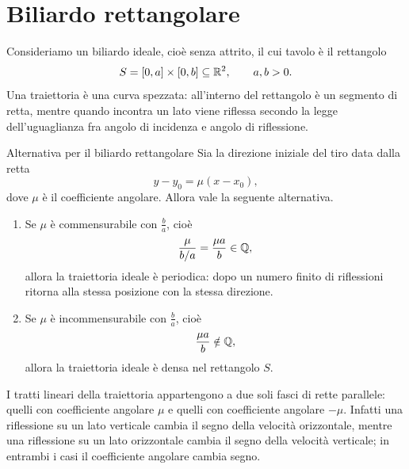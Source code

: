 \documentclass[a4paper]{article}
\begin{document}
\section{Biliardo rettangolare}

Consideriamo un biliardo ideale, cioè senza attrito, il cui tavolo è il rettangolo
\[
    S=[0,a]\times [0,b]\subseteq \mathbb{R}^2,
    \qquad a,b>0.
\]
Una traiettoria è una curva spezzata: all'interno del rettangolo è un segmento di retta, mentre quando incontra un lato viene riflessa secondo la legge dell'uguaglianza fra angolo di incidenza e angolo di riflessione.

\begin{center}
\end{center}

\begin{snippettheorem}{Alternativa per il biliardo rettangolare}
Sia la direzione iniziale del tiro data dalla retta
\[
    y-y_0=\mu(x-x_0),
\]
dove \(\mu\) è il coefficiente angolare. Allora vale la seguente alternativa.

\begin{enumerate}
    \item Se \(\mu\) è commensurabile con \(\frac{b}{a}\), cioè
    \[
        \frac{\mu}{b/a}=\frac{\mu a}{b}\in \mathbb{Q},
    \]
    allora la traiettoria ideale è periodica: dopo un numero finito di riflessioni ritorna alla stessa posizione con la stessa direzione.

    \item Se \(\mu\) è incommensurabile con \(\frac{b}{a}\), cioè
    \[
        \frac{\mu a}{b}\notin \mathbb{Q},
    \]
    allora la traiettoria ideale è densa nel rettangolo \(S\).
\end{enumerate}
\end{snippettheorem}

I tratti lineari della traiettoria appartengono a due soli fasci di rette parallele: quelli con coefficiente angolare \(\mu\) e quelli con coefficiente angolare \(-\mu\). Infatti una riflessione su un lato verticale cambia il segno della velocità orizzontale, mentre una riflessione su un lato orizzontale cambia il segno della velocità verticale; in entrambi i casi il coefficiente angolare cambia segno.
\end{document}
